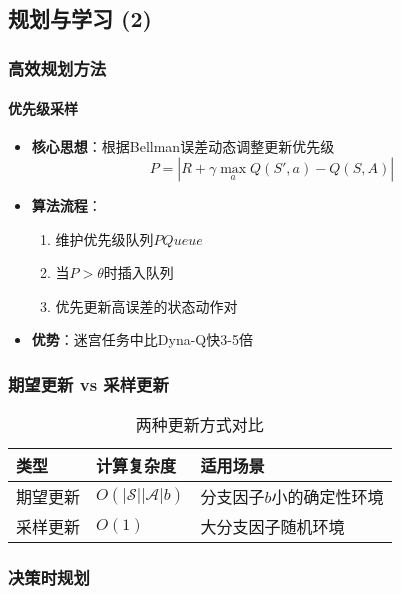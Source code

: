 \subsection{规划与学习 (2)}
\subsubsection{高效规划方法}
\paragraph{优先级采样}
\begin{itemize}
    \item \textbf{核心思想}：根据Bellman误差动态调整更新优先级
    \[
    P = \left| R + \gamma \max_a Q(S',a) - Q(S,A) \right|
    \]
    \item \textbf{算法流程}：
        \begin{enumerate}
            \item 维护优先级队列$PQueue$
            \item 当$P > \theta$时插入队列
            \item 优先更新高误差的状态动作对
        \end{enumerate}
    \item \textbf{优势}：迷宫任务中比Dyna-Q快3-5倍
\end{itemize}

\subsubsection{期望更新 vs 采样更新}
    \begin{table}[H]  %
        \centering
        \caption{两种更新方式对比}
        \begin{tabular}{lll}
        \toprule
        \textbf{类型} & \textbf{计算复杂度} & \textbf{适用场景} \\
        \midrule
        期望更新 & $O(|\mathcal{S}||\mathcal{A}|b)$ & 分支因子$b$小的确定性环境 \\
        采样更新 & $O(1)$ & 大分支因子随机环境 \\
        \bottomrule
        \end{tabular}
    \end{table}

\subsubsection{决策时规划}
